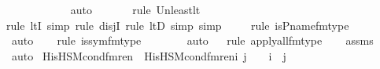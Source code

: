 \begin{isabellebody}
\ \ \ \ \ \ \ \ \ \ \isamarkupfalse%
\ auto{\isacharbrackleft}{\kern0pt}{}{\isacharbrackright}{\kern0pt}\isanewline
\ \ \ \ \ \ \isamarkupfalse%
{\isacharparenleft}{\kern0pt}rule\ Un{\isacharunderscore}{\kern0pt}least{\isacharunderscore}{\kern0pt}lt{\isacharparenright}{\kern0pt}{\isacharplus}{\kern0pt}\isanewline
\ \ \ \ \ \ \ \ \ \isamarkupfalse%
{\isacharparenleft}{\kern0pt}rule\ ltI{\isacharcomma}{\kern0pt}\ simp{\isacharcomma}{\kern0pt}\ rule\ disjI{}{\isacharcomma}{\kern0pt}\ rule\ ltD{\isacharcomma}{\kern0pt}\ simp{\isacharcomma}{\kern0pt}\ simp{\isacharparenright}{\kern0pt}{\isacharplus}{\kern0pt}\isanewline
\ \ \ \ \isamarkupfalse%
{\isacharparenleft}{\kern0pt}rule\ is{\isacharunderscore}{\kern0pt}P{\isacharunderscore}{\kern0pt}name{\isacharunderscore}{\kern0pt}fm{\isacharunderscore}{\kern0pt}type{\isacharparenright}{\kern0pt}\isanewline
\ \ \ \ \ \isamarkupfalse%
\ auto{\isacharbrackleft}{\kern0pt}{}{\isacharbrackright}{\kern0pt}\isanewline
\ \ \ \isamarkupfalse%
{\isacharparenleft}{\kern0pt}rule\ is{\isacharunderscore}{\kern0pt}sym{\isacharunderscore}{\kern0pt}fm{\isacharunderscore}{\kern0pt}type{\isacharparenright}{\kern0pt}\isanewline
\ \ \ \ \ \ \isamarkupfalse%
\ auto{\isacharbrackleft}{\kern0pt}{}{\isacharbrackright}{\kern0pt}\isanewline
\ \ \isamarkupfalse%
{\isacharparenleft}{\kern0pt}rule\ apply{\isacharunderscore}{\kern0pt}all{\isacharunderscore}{\kern0pt}{}{\isacharunderscore}{\kern0pt}fm{\isacharunderscore}{\kern0pt}type{\isacharparenright}{\kern0pt}\isanewline
\ \ \isamarkupfalse%
\ assms\ \isanewline
\ \ \isamarkupfalse%
\ auto%
\endisatagproof
{\isafoldproof}%
%
\isadelimproof
\isanewline
%
\endisadelimproof
\isanewline
{}\isamarkupfalse%
\isanewline
\isanewline
{}\isamarkupfalse%
\ His{\isacharunderscore}{\kern0pt}HS{\isacharunderscore}{\kern0pt}M{\isacharunderscore}{\kern0pt}cond{\isacharunderscore}{\kern0pt}fm{\isacharunderscore}{\kern0pt}ren\ \ {\isachardoublequoteopen}His{\isacharunderscore}{\kern0pt}HS{\isacharunderscore}{\kern0pt}M{\isacharunderscore}{\kern0pt}cond{\isacharunderscore}{\kern0pt}fm{\isacharunderscore}{\kern0pt}ren{\isacharparenleft}{\kern0pt}i{\isacharcomma}{\kern0pt}\ j{\isacharparenright}{\kern0pt}\ {\isasymequiv}\ {\isacharbraceleft}{\kern0pt}\ {\isacharless}{\kern0pt}{}{\isacharcomma}{\kern0pt}\ i{\isachargreater}{\kern0pt}{\isacharcomma}{\kern0pt}\ {\isacharless}{\kern0pt}{}{\isacharcomma}{\kern0pt}\ j{\isachargreater}{\kern0pt}\ {\isacharbraceright}{\kern0pt}{\isachardoublequoteclose}\ \isanewline

\end{isabellebody}
